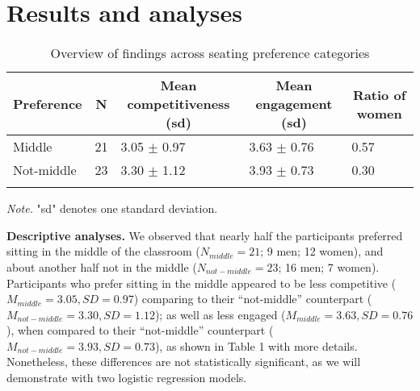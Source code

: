 \documentclass[man]{apa6}
\begin{document}
\hypertarget{results-and-analyses}{%
\section{Results and analyses}\label{results-and-analyses}}

\begin{table}[tbp]
\begin{center}
\begin{threeparttable}
\caption{\label{tab:Seating preference}Overview of findings across seating preference categories}
\begin{tabular}{lllll}
\toprule
Preference & \multicolumn{1}{c}{N} & \multicolumn{1}{c}{Mean competitiveness (sd)} & \multicolumn{1}{c}{Mean engagement (sd)} & \multicolumn{1}{c}{Ratio of women}\\
\midrule
Middle & 21 & 3.05 $\pm$ 0.97 & 3.63 $\pm$ 0.76 & 0.57\\
Not-middle & 23 & 3.30 $\pm$ 1.12 & 3.93 $\pm$ 0.73 & 0.30\\
\bottomrule
\addlinespace
\end{tabular}
\begin{tablenotes}[para]
\normalsize{\textit{Note.} "sd" denotes one standard deviation.}
\end{tablenotes}
\end{threeparttable}
\end{center}
\end{table}

\textbf{Descriptive analyses.} We observed that nearly half the participants preferred sitting in the middle of the classroom (\(N_{middle} = 21\); 9 men; 12 women), and about another half not in the middle (\(N_{not-middle} = 23\); 16 men; 7 women). Participants who prefer sitting in the middle appeared to be less competitive (\(M_{middle} = 3.05, SD = 0.97\)) comparing to their \enquote{not-middle} counterpart (\(M_{not-middle} = 3.30, SD = 1.12\)); as well as less engaged (\(M_{middle} = 3.63, SD = 0.76\)), when compared to their \enquote{not-middle} counterpart (\(M_{not-middle} = 3.93, SD = 0.73\)), as shown in Table 1 with more details. Nonetheless, these differences are not statistically significant, as we will demonstrate with two logistic regression models.
\end{document}
